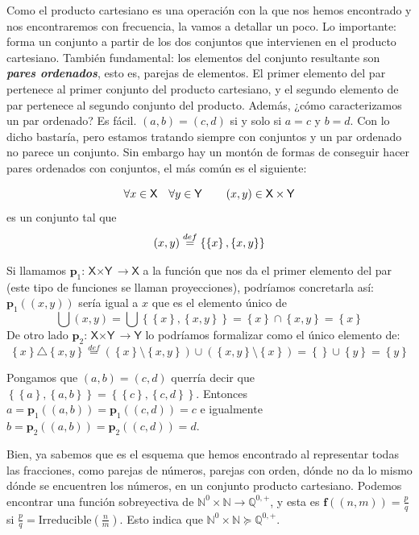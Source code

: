 \documentclass{amsart}
\theoremstyle{definition}
\theoremstyle{remark}
\numberwithin{equation}{section}
\newcommand{\set}[1]{\left\lbrace{#1}\right\rbrace}
\newcommand{\setN}{\mathds N}
\newcommand{\setQ}{\mathds Q}
\newcommand{\fromto}{\longrightarrow}
\newcommand{\setsymbol}[1]{\textsf{#1}}
\newcommand{\sX}{\setsymbol{X}}
\newcommand{\sY}{\setsymbol{Y}}
\newcommand{\monrel}[1]{\mathbf{#1}}
\newcommand{\funct}[1]{\monrel{#1}}
\newcommand{\defin}{\overset {def}{=}}
\newcommand{\geqpot}{\succcurlyeq}
\begin{document}
	Como el producto cartesiano es una operación con la que nos hemos 
encontrado y nos encontraremos con frecuencia, la vamos a detallar un poco. 
Lo importante: forma un conjunto a partir de los dos conjuntos que 
intervienen en el producto cartesiano. También fundamental: los elementos del 
conjunto resultante son \textbf{\emph{pares ordenados}}, esto es, parejas de 
elementos. El primer elemento del par pertenece al primer conjunto del 
producto cartesiano, y el segundo elemento de par pertenece al segundo 
conjunto del producto. Además, ¿cómo caracterizamos un par ordenado? Es 
fácil. $\left({a,b}\right)=\left({c,d}\right)$ si y solo si $a = c$ y $b = 
d$. Con lo dicho bastaría, pero estamos tratando siempre con conjuntos y un 
par ordenado no parece un conjunto. Sin embargo hay un montón de formas de 
conseguir hacer pares ordenados con conjuntos, el más común es el siguiente:


$$
\forall x \in \sX \quad \forall y \in \sY \qquad \ordpair{x}{y} \in 
\sX\times\sY
$$
es un conjunto tal que
$$
\ordpair{x}{y} \defin \set{\set{x},\set{x,y}}
$$


	Si llamamos ${\funct{p}_1} : {\sX\times\sY} \fromto {\sX}$ a la función 
que nos da el primer elemento del par (este tipo de funciones se llaman 
proyecciones), podríamos concretarla así: 
${\funct{p}_1}{\left({\left({x,y}\right)}\right)}$ sería igual a $x$ que es 
el elemento único de 
$$\bigcup{\left({x,y}\right)} = \bigcup{\set{\set{x},\set{x,y}}} = 
\set{x}\cap\set{x,y} = \set{x}$$
De otro lado ${\funct{p}_2} : {\sX\times\sY} \fromto {\sY}$ lo podríamos 
formalizar como el único elemento de:
$$\set{x}\triangle\set{x,y}\defin\left({\set{x}}\setminus{\set{x,y}}\right)\cup
\left({\set{x,y}}\setminus{\set{x}}\right) = 
\set{}\cup\set{y} = \set{y}$$



	Pongamos que $\left({a,b}\right)=\left({c,d}\right)$ querría decir que 
$\set{\set{a},\set{a,b}} = \set{\set{c},\set{c,d}}$. Entonces $a = 
\funct{p}_1{\left({\left({a,b}\right)}\right)}=
\funct{p}_1{\left({\left({c,d}\right)}\right)}= c$ e igualmente $b = 
\funct{p}_2{\left({\left({a,b}\right)}\right)}=
\funct{p}_2{\left({\left({c,d}\right)}\right)}= d$.



	Bien, ya sabemos que es el esquema que hemos encontrado al representar 
todas las fracciones, como parejas de números, parejas con orden, dónde no da
lo mismo dónde se encuentren los números, en un conjunto producto cartesiano.
Podemos encontrar una función sobreyectiva de
$\setN^{0}\times\setN\fromto\setQ^{0,+}$, y esta es
$\funct{f}((n,m)) = \frac{p}{q}$ si $\frac{p}{q} = 
\text{Irreducible}({\frac{n}{m}})$. Esto indica que 
$\setN^{0}\times\setN\geqpot\setQ^{0,+}$.
\end{document}
